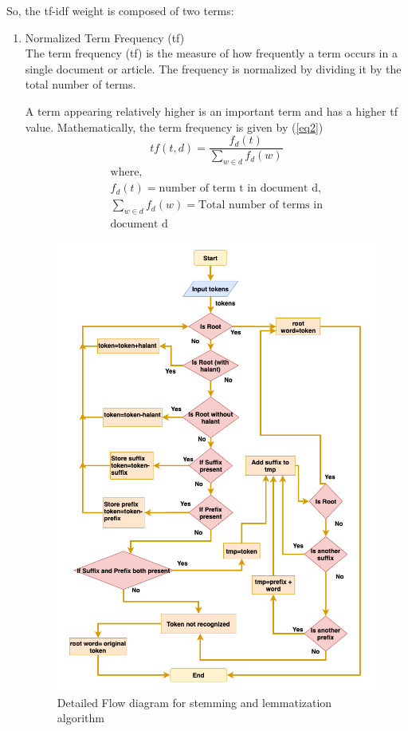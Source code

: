 \documentclass[conference]{IEEEtran}
\begin{document}
So, the tf-idf weight is composed of two terms:
\begin{enumerate}
\item Normalized Term Frequency (tf)\\
The term frequency (tf) is the measure of how frequently a term occurs in a
single document or article. The frequency is normalized by dividing it by
the total number of terms.
\medskip

A term appearing relatively higher is an important term and has a higher tf
value. Mathematically, the term frequency is given by (\ref{eq2})
\begin{equation}tf(t,d) = \frac{f_d(t)}{\sum_{w\in d}{f_d(w)}} \label{eq2}
\end{equation}
   \begin{gather*}
  \text{where},\\
  f_d(t)=\text{number of term t in document d},\\
  \sum_{w\in d}{f_d(w)} = \text{Total number of terms in}\\ \text{document d}
\end{gather*}\medskip

\newpage
\onecolumn

\begin{figure}[htbp]
\centering
\includegraphics[width=0.8 \textwidth, keepaspectratio]{figures/stemming.png}
\caption{Detailed Flow diagram for stemming and lemmatization algorithm}
\label{stemming}
\end{figure}


\end{enumerate}
\end{document}
